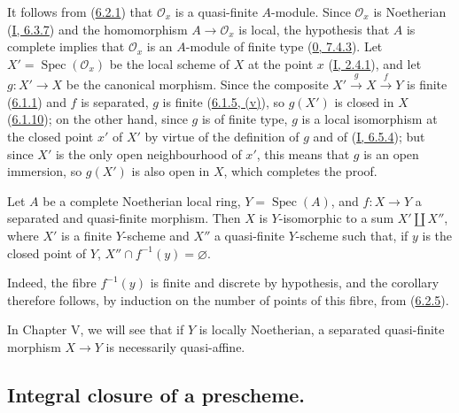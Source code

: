 It follows from (\hyperref[II.6.2.1]{6.2.1}) that $\mathcal{O}_x$ is a
quasi-finite $A$-module. Since $\mathcal{O}_x$ is Noetherian
(\hyperref[I.6.3.7]{I, 6.3.7}) and the homomorphism
$A\to\mathcal{O}_x$ is local, the hypothesis that $A$ is complete implies
that $\mathcal{O}_x$ is an $A$-module of finite type
(\hyperref[0.7.4.3]{0, 7.4.3}). Let
$X'=\operatorname{Spec}(\mathcal{O}_x)$ be the local scheme of $X$ at the
point $x$ (\hyperref[I.2.4.1]{I, 2.4.1}), and let $g:X'\to X$ be the
canonical morphism. Since the composite $X'\xrightarrow{g}X\xrightarrow{f}Y$
is finite (\hyperref[II.6.1.1]{6.1.1}) and $f$ is separated, $g$ is
finite (\hyperref[II.6.1.5]{6.1.5, (v)}), so $g(X')$ is closed in $X$
(\hyperref[II.6.1.10]{6.1.10}); on the other hand, since $g$ is of finite
type, $g$ is a local isomorphism at the closed point $x'$ of $X'$ by virtue
of the definition of $g$ and of (\hyperref[I.6.5.4]{I, 6.5.4}); but since
$X'$ is the only open neighbourhood of $x'$, this means that $g$ is an open
immersion, so $g(X')$ is also open in $X$, which completes the proof.

\begin{corollary}[6.2.6]
\label{II.6.2.6}
Let $A$ be a complete Noetherian local ring, $Y=\operatorname{Spec}(A)$, and
$f:X\to Y$ a separated and quasi-finite morphism. Then $X$ is $Y$-isomorphic
to a sum $X'\amalg X''$, where $X'$ is a finite $Y$-scheme and $X''$ a
quasi-finite $Y$-scheme such that, if $y$ is the closed point of $Y$,
$X''\cap f^{-1}(y)=\varnothing$.
\end{corollary}

Indeed, the fibre $f^{-1}(y)$ is finite and discrete by hypothesis, and the
corollary therefore follows, by induction on the number of points of this
fibre, from (\hyperref[II.6.2.5]{6.2.5}).

\begin{remark}[6.2.7]
\label{II.6.2.7}
In Chapter V, we will see that if $Y$ is locally Noetherian, a separated
quasi-finite morphism $X\to Y$ is necessarily quasi-affine.
\end{remark}

\subsection{Integral closure of a prescheme.}
\label{subsection:II.6.3}

